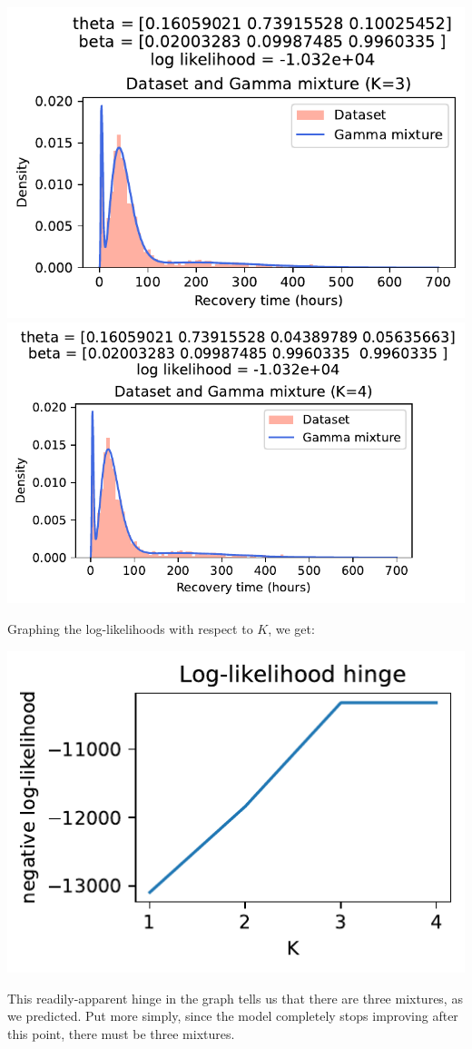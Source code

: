\documentclass[expanded]{lkx_pset}
\begin{document}
\begin{parts}
\begin{center}
		\includegraphics[scale=0.7]{figures/p2_3_3mixtures.pdf}
		\includegraphics[scale=0.7]{figures/p2_3_4mixtures.pdf}
	\end{center}
	Graphing the log-likelihoods with respect to $K$, we get:
	\begin{center}
		\includegraphics[scale=0.7]{figures/p2_3_hinge.pdf}
	\end{center}
	This readily-apparent hinge in the graph tells us that there are three mixtures, as we predicted. Put more simply, since the model completely stops improving after this point, there must be three mixtures.


\end{parts}
\end{document}
